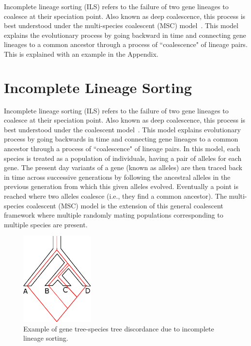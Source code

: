 Incomplete lineage sorting (ILS) refers to the failure of two gene lineages to coalesce at their speciation point. Also known as deep coalescence, this process is best understood under the multi-species coalescent (MSC) model~\cite{degnan2006discordance, degnan2005gene}. This model explains the evolutionary process by going backward in time and connecting gene lineages to a common ancestor through a process of ``coalescence" of lineage pairs. This is explained with an example in the Appendix.

\section{Incomplete Lineage Sorting}%
Incomplete lineage sorting (ILS) refers to the failure of two gene lineages to coalesce at their speciation point. Also known as deep coalescence, this process is best understood under the coalescent model~\cite{degnan2006discordance, degnan2005gene}. This model explains evolutionary process by going backwards in time and connecting gene lineages to a common ancestor through a process of ``coalescence" of lineage pairs. In this model, each species is treated as a population of individuals, having a pair of alleles for each gene. The present day variants of a gene (known as alleles) are then traced back in time across successive generations by following the ancestral alleles in the previous generation from which this given alleles evolved. Eventually a point is reached where two alleles coalesce (i.e., they find a common ancestor). The multi-species coalescent (MSC) model is the extension of this general coalescent framework where multiple randomly mating populations corresponding to multiple species are present.
\begin{figure}[!tb]
	\centering
	\includegraphics[width=0.33\textwidth]{Figure/ils.eps}
	\caption{Example of gene tree-species tree discordance due to incomplete lineage sorting. %
	}
	\label{fig:ils}
\end{figure}

